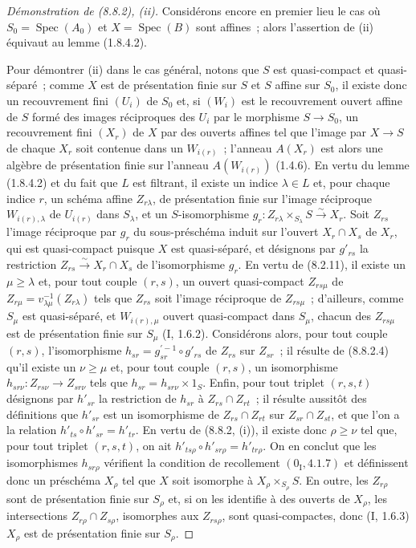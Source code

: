 \begin{proof}[Démonstration de (8.8.2), (ii)]
Considérons encore en premier lieu le cas où $S_0=\operatorname{Spec}(A_0)$ et
$X=\operatorname{Spec}(B)$ sont affines~; alors l'assertion de (ii) équivaut
au lemme (1.8.4.2).

Pour démontrer (ii) dans le cas général, notons que $S$ est quasi-compact et
quasi-séparé~; comme $X$ est de présentation finie sur $S$ et $S$ affine sur
$S_0$, il existe donc un recouvrement fini $(U_i)$ de $S_0$ et, si $(W_i)$ est
le recouvrement ouvert affine de $S$ formé des images réciproques des $U_i$
par le morphisme $S\to S_0$, un recouvrement fini $(X_r)$ de $X$ par des
ouverts affines tel que l'image par $X\to S$ de chaque $X_r$ soit contenue
dans un $W_{i(r)}$~; l'anneau $A(X_r)$ est alors une algèbre de présentation
finie sur l'anneau $A(W_{i(r)})$ (1.4.6). En vertu du lemme (1.8.4.2) et du
fait que $L$ est filtrant, il existe un indice $\lambda\in L$ et, pour chaque
indice $r$, un schéma affine $Z_{r\lambda}$, de présentation finie sur l'image
réciproque $W_{i(r),\lambda}$ de $U_{i(r)}$ dans $S_\lambda$, et un
$S$-isomorphisme
$g_r:Z_{r\lambda}\times_{S_\lambda}S\xrightarrow{\sim}X_r$. Soit $Z_{rs}$
l'image réciproque par $g_r$ du sous-préschéma induit sur l'ouvert
$X_r\cap X_s$ de $X_r$, qui est quasi-compact puisque $X$ est quasi-séparé,
et désignons par $g'_{rs}$ la restriction
$Z_{rs}\xrightarrow{\sim}X_r\cap X_s$ de l'isomorphisme $g_r$. En vertu de
(8.2.11), il existe un $\mu\geq\lambda$ et, pour tout couple $(r,s)$, un
ouvert quasi-compact $Z_{rs\mu}$ de
$Z_{r\mu}=v_{\lambda\mu}^{-1}(Z_{r\lambda})$ tels que $Z_{rs}$ soit l'image
réciproque de $Z_{rs\mu}$~; d'ailleurs, comme $S_\mu$ est quasi-séparé, et
$W_{i(r),\mu}$ ouvert quasi-compact dans $S_\mu$, chacun des $Z_{rs\mu}$ est
de présentation finie sur $S_\mu$ (I, 1.6.2). Considérons alors, pour tout
couple $(r,s)$, l'isomorphisme
$h_{sr}=g_{sr}^{'-1}\circ g'_{rs}$ de $Z_{rs}$ sur $Z_{sr}$~; il résulte de
(8.8.2.4) qu'il existe un $\nu\geq\mu$ et, pour tout couple $(r,s)$, un
isomorphisme $h_{sr\nu}:Z_{rs\nu}\to Z_{sr\nu}$ tels que
$h_{sr}=h_{sr\nu}\times1_S$. Enfin, pour tout triplet $(r,s,t)$ désignons par
$h'_{sr}$ la restriction de $h_{sr}$ à
$Z_{rs}\cap Z_{rt}$~; il résulte aussitôt des définitions que $h'_{sr}$ est un
isomorphisme de $Z_{rs}\cap Z_{rt}$ sur $Z_{sr}\cap Z_{st}$, et que l'on a la
relation $h'_{ts}\circ h'_{sr}=h'_{tr}$. En vertu de (8.8.2, (i)), il existe
donc $\rho\geq\nu$ tel que, pour tout triplet $(r,s,t)$, on ait
$h'_{ts\rho}\circ h'_{sr\rho}=h'_{tr\rho}$. On en conclut que les
isomorphismes $h_{sr\rho}$ vérifient la condition de recollement
$(0_{\mathrm I}, 4.1.7)$ et définissent donc un préschéma $X_\rho$ tel que $X$
soit isomorphe à $X_\rho\times_{S_\rho}S$. En outre, les $Z_{r\rho}$ sont de
présentation finie sur $S_\rho$ et, si on les identifie à des ouverts de
$X_\rho$, les intersections $Z_{r\rho}\cap Z_{s\rho}$, isomorphes aux
$Z_{rs\rho}$, sont quasi-compactes, donc (I, 1.6.3) $X_\rho$ est de
présentation finie sur $S_\rho$.
\end{proof}


